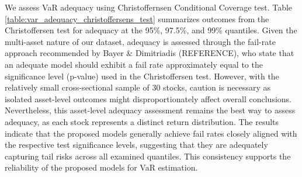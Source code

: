 We assess VaR adequacy using Christoffernsen Conditional Coverage test. Table \ref{table:var_adequacy_christoffersens_test} summarizes outcomes from the Christoffersen test for adequacy at the 95\%, 97.5\%, and 99\% quantiles. Given the multi-asset nature of our dataset, adequacy is assessed through the fail-rate approach recommended by Bayer \& Dimitriadis (REFERENCE), who state that an adequate model should exhibit a fail rate approximately equal to the significance level (p-value) used in the Christoffersen test. However, with the relatively small cross-sectional sample of 30 stocks, caution is necessary as isolated asset-level outcomes might disproportionately affect overall conclusions. Nevertheless, this asset-level adequacy assessment remains the best way to assess adequacy, as each stock represents a distinct return distribution. The results indicate that the proposed models generally achieve fail rates closely aligned with the respective test significance levels, suggesting that they are adequately capturing tail risks across all examined quantiles. This consistency supports the reliability of the proposed models for VaR estimation.

